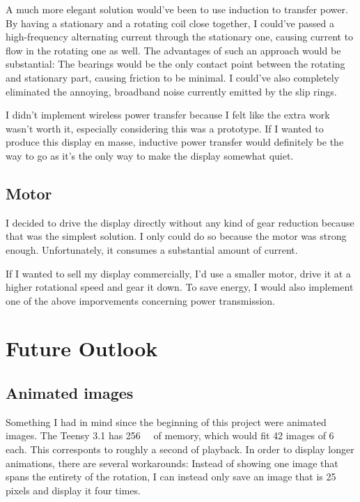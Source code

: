 \documentclass[a4paper, 11pt, titlepage]{report}
\begin{document}
A much more elegant solution would've been to use induction to transfer power. By having a
stationary and a rotating coil close together, I could've passed a high-frequency alternating
current through the stationary one, causing current to flow in the rotating one as well. The
advantages of such an approach would be substantial: The bearings would be the only contact point
between the rotating and stationary part, causing friction to be minimal. I could've also
completely eliminated the annoying, broadband noise currently emitted by the slip rings.

I didn't implement wireless power transfer because I felt like the extra work wasn't worth it,
especially considering this was a prototype. If I wanted to produce this display en masse,
inductive power transfer would definitely be the way to go as it's the only way to make the
display somewhat quiet.


\subsection{Motor}

I decided to drive the display directly without any kind of gear reduction because that was the
simplest solution. I only could do so because the motor was strong enough. Unfortunately, it
consumes a substantial amount of current.

If I wanted to sell my display commercially, I'd use a smaller motor, drive it at a higher
rotational speed and gear it down. To save energy, I would also implement one of the above
imporvements concerning power transmission.


\section{Future Outlook}

\subsection{Animated images}

Something I had in mind since the beginning of this project were animated images. The Teensy 3.1
has \SI{256}{\kilo\byte} of memory, which would fit 42 images of \SI{6}{\kilo\byte} each. This
corresponts to roughly a second of playback. In order to display longer animations, there are
several workarounds: Instead of showing one image that spans the entirety of the rotation, I can
instead only save an image that is 25 pixels and display it four times.
\end{document}
